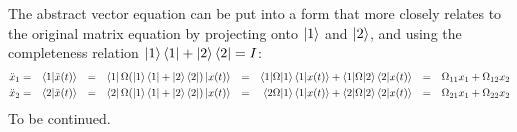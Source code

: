 \documentclass{article}
\begin{document}
The abstract vector equation can be put into a form that more closely relates to the original matrix equation by projecting onto $\ket{1}$ and $\ket{2}$, and using the completeness relation $\ket{1}\bra{1} + \ket{2}\bra{2} = I$:
\begin{align*}
\begin{aligned}
 \ddot{x}_1 & = & \braket{1 | \ddot{x}(t)} && = && \bra{1} \Omega (\ket{1}\bra{1} + \ket{2}\bra{2}) \ket{x(t)} && = && \braket{1|\Omega|1}\braket{1|x(t)} + \braket{1|\Omega|2}\braket{2|x(t)} && = &&\Omega_{11}x_1 + \Omega_{12}x_2 \\
\ddot{x}_2 & = & \braket{2 | \ddot{x}(t)} && = && \bra{2} \Omega(\ket{1}\bra{1} + \ket{2}\bra{2}) \ket{x(t)} &&= && \braket{2 \Omega | 1}\braket{1|x(t)} + \braket{2|\Omega|2}\braket{2|x(t)} && = &&
\Omega_{21}x_1 + \Omega_{22}x_2
\end{aligned}
\end{align*} 
To be continued.
\end{document}
